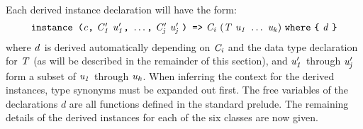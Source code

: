 
Each derived instance declaration will have the form:
\[
\mbox{$\it \makebox{\tt instance\ (}c\makebox{\tt ,}\ C'_1\ u'_1\makebox{\tt ,}\ \ldots \makebox{\tt ,}\ C'_j\ u'_j\ \makebox{\tt )\ =>}\ C_i\ (T\ u_1\ \ldots \ u_k)\ \makebox{\tt where}\ \makebox{\tt {\char'173}}\ d\ \makebox{\tt {\char'175}}$}
\]
where \mbox{$\it d$} is derived automatically depending on \mbox{$\it C_i$} and the data
type declaration for \mbox{$\it T$} (as will be described in the remainder of
this section), and \mbox{$\it u'_1$} through \mbox{$\it u'_j$} form a subset of \mbox{$\it u_1$}
through \mbox{$\it u_k$}.
When inferring the context for the derived instances, type synonyms
must be expanded out first.
The free variables of the declarations $d$ are all functions
defined in the standard prelude.
The remaining details of the derived
instances for each of the six classes are now given.

